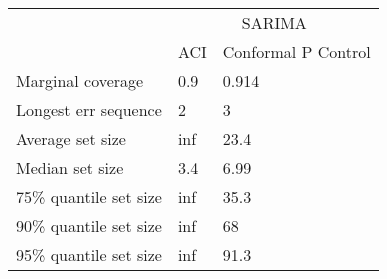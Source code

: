 \begin{tabular}{lll}
\toprule
& \multicolumn{2}{c}{SARIMA} \\
& ACI & Conformal P Control \\
\midrule
Marginal coverage & 0.9 & 0.914 \\
Longest err sequence & 2 & 3 \\
Average set size & inf & 23.4 \\
Median set size & 3.4 & 6.99 \\
75\% quantile set size & inf & 35.3 \\
90\% quantile set size & inf & 68 \\
95\% quantile set size & inf & 91.3 \\
\bottomrule
\end{tabular}
